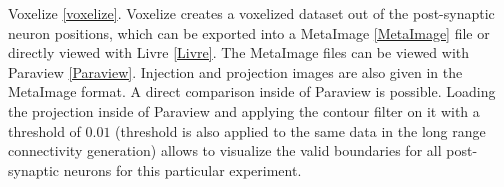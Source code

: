 Voxelize \ref{voxelize}. Voxelize creates a voxelized dataset out of the post-synaptic neuron positions, which can be exported into
a MetaImage \ref{MetaImage} file or directly viewed with Livre \ref{Livre}.
The MetaImage files can be viewed with Paraview \ref{Paraview}.
Injection and projection images are also given in the MetaImage format.
A direct comparison inside of Paraview is possible.
Loading the projection inside of Paraview and applying the contour filter on it with a threshold of $0.01$ (threshold is also applied to the same data in the long range connectivity generation) allows to visualize the valid boundaries for all post-synaptic neurons for this particular experiment.
 
\begin{figure}[ht!]
   	\begin{center}
        \hspace{0.2cm}
\end{center}
\end{figure}
